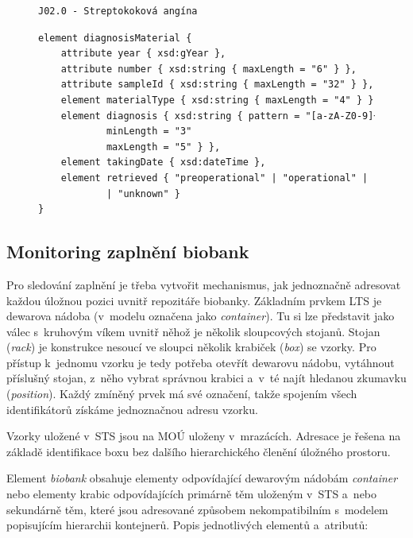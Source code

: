 \documentclass[11pt,draft,oneside]{fithesis2}
\begin{document}
\begin{figure}[h!]
\centering
\begin{BVerbatim}
J02.0 - Streptokoková angína
\end{BVerbatim}
\end{figure}

\begin{figure}[h!]
\begin{center}
\begin{lstlisting}[language=XML, caption={Element popisující materiál se stanovenou diagnózou v~exportním schématu.}, label={fig:export:data:diagnosisMaterial}]
element diagnosisMaterial {
	attribute year { xsd:gYear },
	attribute number { xsd:string { maxLength = "6" } },
	attribute sampleId { xsd:string { maxLength = "32" } },
	element materialType { xsd:string { maxLength = "4" } }
	element diagnosis { xsd:string { pattern = "[a-zA-Z0-9]+" 
			minLength = "3" 
			maxLength = "5" } },
	element takingDate { xsd:dateTime },
	element retrieved { "preoperational" | "operational" | "post" 
			| "unknown" }
}
\end{lstlisting}
\end{center}
\end{figure}

\subsection{Monitoring zaplnění biobank}\label{chapter:analysis:subsection:monitoring}
Pro sledování zaplnění je třeba vytvořit mechanismus, jak jednoznačně adresovat každou úložnou pozici uvnitř repozitáře biobanky. 
Základním prvkem LTS je dewarova nádoba (v~modelu označena jako \textit{container}). Tu si lze představit jako válec s~kruhovým víkem uvnitř něhož je několik sloupcových stojanů. Stojan (\textit{rack}) je konstrukce nesoucí ve sloupci několik krabiček (\textit{box}) se vzorky. Pro přístup k~jednomu vzorku je tedy potřeba otevřít dewarovu nádobu, vytáhnout příslušný stojan, z~něho vybrat správnou krabici a~v~té najít hledanou zkumavku (\textit{position}). Každý zmíněný prvek má své označení, takže spojením všech identifikátorů získáme jednoznačnou adresu vzorku.

Vzorky uložené v~STS jsou na MOÚ uloženy v~mrazácích. Adresace je řešena na základě identifikace boxu bez dalšího hierarchického členění úložného prostoru.

Element \textit{biobank} obsahuje elementy odpovídající dewarovým nádobám \textit{container} nebo elementy  krabic odpovídajících primárně těm uloženým v~STS a~nebo sekundárně těm, které jsou adresované způsobem nekompatibilním s~modelem popisujícím hierarchii kontejnerů. Popis jednotlivých elementů a~atributů:
\end{document}

